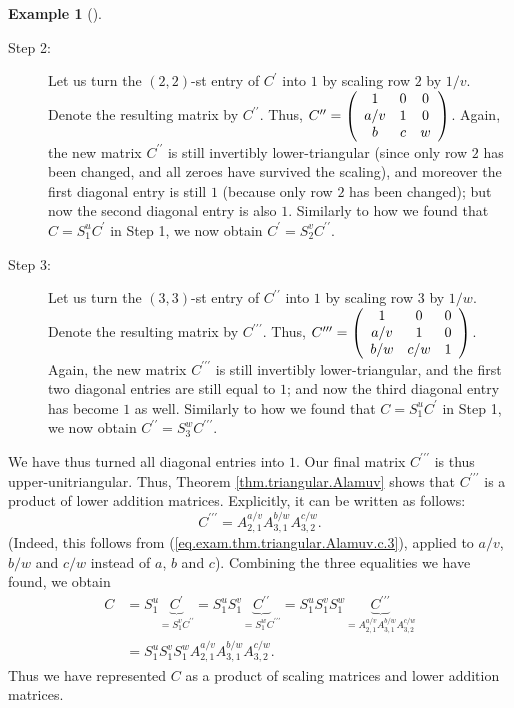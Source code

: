 \documentclass[numbers=enddot,12pt,final,onecolumn,notitlepage]{scrartcl}%
\theoremstyle{definition}
\newtheorem{exam}[theo]{Example}
\newenvironment{example}[1][]
{\begin{exam}[#1]\begin{leftbar}}
{\end{leftbar}\end{exam}}
\begin{document}
\begin{example}
\begin{description}
\item[Step 2:] Let us turn the $\left(  2,2\right)  $-st entry of $C^{\prime}$
into $1$ by scaling row $2$ by $1/v$. Denote the resulting matrix by
$C^{\prime\prime}$. Thus, $C^{\prime\prime}=\left(
\begin{array}
[c]{ccc}%
1 & 0 & 0\\
a/v & 1 & 0\\
b & c & w
\end{array}
\right)  $. Again, the new matrix $C^{\prime\prime}$ is still invertibly
lower-triangular (since only row $2$ has been changed, and all zeroes have
survived the scaling), and moreover the first diagonal entry is still $1$
(because only row $2$ has been changed); but now the second diagonal entry is
also $1$. Similarly to how we found that $C=S_{1}^{u}C^{\prime}$ in Step 1, we
now obtain $C^{\prime}=S_{2}^{v}C^{\prime\prime}$.

\item[Step 3:] Let us turn the $\left(  3,3\right)  $-st entry of
$C^{\prime\prime}$ into $1$ by scaling row $3$ by $1/w$. Denote the resulting
matrix by $C^{\prime\prime\prime}$. Thus, $C^{\prime\prime\prime}=\left(
\begin{array}
[c]{ccc}%
1 & 0 & 0\\
a/v & 1 & 0\\
b/w & c/w & 1
\end{array}
\right)  $. Again, the new matrix $C^{\prime\prime\prime}$ is still invertibly
lower-triangular, and the first two diagonal entries are still equal to $1$;
and now the third diagonal entry has become $1$ as well. Similarly to how we
found that $C=S_{1}^{u}C^{\prime}$ in Step 1, we now obtain $C^{\prime\prime
}=S_{3}^{w}C^{\prime\prime\prime}$.
\end{description}

We have thus turned all diagonal entries into $1$. Our final matrix
$C^{\prime\prime\prime}$ is thus upper-unitriangular. Thus, Theorem
\ref{thm.triangular.Alamuv} shows that $C^{\prime\prime\prime}$ is a product
of lower addition matrices. Explicitly, it can be written as follows:%
\[
C^{\prime\prime\prime}=A_{2,1}^{a/v}A_{3,1}^{b/w}A_{3,2}^{c/w}.
\]
(Indeed, this follows from (\ref{eq.exam.thm.triangular.Alamuv.c.3}), applied
to $a/v$, $b/w$ and $c/w$ instead of $a$, $b$ and $c$). Combining the three
equalities we have found, we obtain%
\begin{align*}
C  &  =S_{1}^{u}\underbrace{C^{\prime}}_{=S_{1}^{v}C^{\prime\prime}}=S_{1}%
^{u}S_{1}^{v}\underbrace{C^{\prime\prime}}_{=S_{1}^{w}C^{\prime\prime\prime}%
}=S_{1}^{u}S_{1}^{v}S_{1}^{w}\underbrace{C^{\prime\prime\prime}}%
_{=A_{2,1}^{a/v}A_{3,1}^{b/w}A_{3,2}^{c/w}}\\
&  =S_{1}^{u}S_{1}^{v}S_{1}^{w}A_{2,1}^{a/v}A_{3,1}^{b/w}A_{3,2}^{c/w}.
\end{align*}
Thus we have represented $C$ as a product of scaling matrices and lower
addition matrices.
\end{example}
\end{document}
